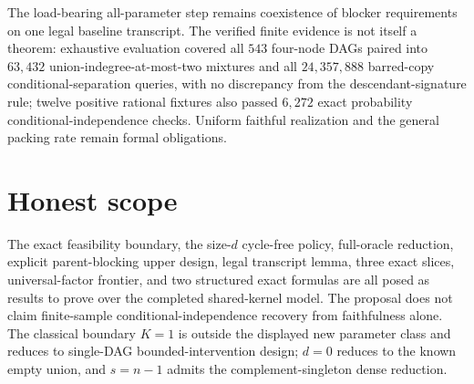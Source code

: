 \documentclass{article}
\begin{document}
The load-bearing all-parameter step remains coexistence of blocker requirements on one legal baseline transcript. The verified finite evidence is not itself a theorem: exhaustive evaluation covered all \(543\) four-node DAGs paired into \(63{,}432\) union-indegree-at-most-two mixtures and all \(24{,}357{,}888\) barred-copy conditional-separation queries, with no discrepancy from the descendant-signature rule; twelve positive rational fixtures also passed \(6{,}272\) exact probability conditional-independence checks. Uniform faithful realization and the general packing rate remain formal obligations.

\section{Honest scope}

The exact feasibility boundary, the size-\(d\) cycle-free policy, full-oracle reduction, explicit parent-blocking upper design, legal transcript lemma, three exact slices, universal-factor frontier, and two structured exact formulas are all posed as results to prove over the completed shared-kernel model. The proposal does not claim finite-sample conditional-independence recovery from faithfulness alone. The classical boundary \(K=1\) is outside the displayed new parameter class and reduces to single-DAG bounded-intervention design; \(d=0\) reduces to the known empty union, and \(s=n-1\) admits the complement-singleton dense reduction.
\end{document}
